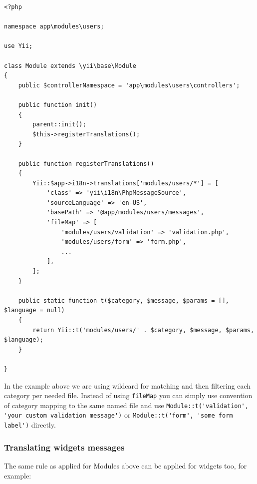 \lstset{language=php}\begin{lstlisting}
<?php

namespace app\modules\users;

use Yii;

class Module extends \yii\base\Module
{
    public $controllerNamespace = 'app\modules\users\controllers';

    public function init()
    {
        parent::init();
        $this->registerTranslations();
    }

    public function registerTranslations()
    {
        Yii::$app->i18n->translations['modules/users/*'] = [
            'class' => 'yii\i18n\PhpMessageSource',
            'sourceLanguage' => 'en-US',
            'basePath' => '@app/modules/users/messages',
            'fileMap' => [
                'modules/users/validation' => 'validation.php',
                'modules/users/form' => 'form.php',
                ...
            ],
        ];
    }

    public static function t($category, $message, $params = [], $language = null)
    {
        return Yii::t('modules/users/' . $category, $message, $params, $language);
    }

}
\end{lstlisting}
In the example above we are using wildcard for matching and then filtering each category per needed file. Instead of using \lstinline|fileMap| you can simply
use convention of category mapping to the same named file and use \lstinline|Module::t('validation', 'your custom validation message')| or \lstinline|Module::t('form', 'some form label')| directly.

\subsubsection{Translating widgets messages}
The same rule as applied for Modules above can be applied for widgets too, for example:

